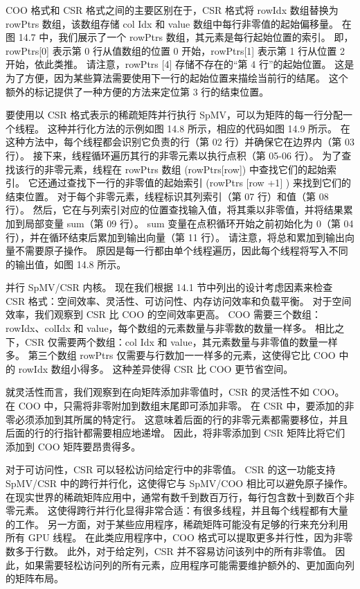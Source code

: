 COO 格式和 CSR 格式之间的主要区别在于，CSR 格式将 rowIdx 数组替换为 rowPtrs 数组，该数组存储 col Idx 和 value 数组中每行非零值的起始偏移量。 在图 14.7 中，我们展示了一个 rowPtrs 数组，其元素是每行起始位置的索引。 即，rowPtrs[0] 表示第 0 行从值数组的位置 0 开始，rowPtrs[1] 表示第 1 行从位置 2 开始，依此类推。 请注意，rowPtrs [4] 存储不存在的“第 4 行”的起始位置。 这是为了方便，因为某些算法需要使用下一行的起始位置来描绘当前行的结尾。 这个额外的标记提供了一种方便的方法来定位第 3 行的结束位置。

要使用以 CSR 格式表示的稀疏矩阵并行执行 SpMV，可以为矩阵的每一行分配一个线程。 这种并行化方法的示例如图 14.8 所示，相应的代码如图 14.9 所示。 在这种方法中，每个线程都会识别它负责的行（第 02 行）并确保它在边界内（第 03 行）。 接下来，线程循环遍历其行的非零元素以执行点积（第 05-06 行）。 为了查找该行的非零元素，线程在 rowPtrs 数组 (rowPtrs[row]) 中查找它们的起始索引。 它还通过查找下一行的非零值的起始索引 (rowPtrs [row +1$]$ ) 来找到它们的结束位置。 对于每个非零元素，线程标识其列索引（第 07 行）和值（第 08 行）。 然后，它在与列索引对应的位置查找输入值，将其乘以非零值，并将结果累加到局部变量 sum（第 09 行）。 sum 变量在点积循环开始之前初始化为 0（第 04 行），并在循环结束后累加到输出向量（第 11 行）。 请注意，将总和累加到输出向量不需要原子操作。 原因是每一行都由单个线程遍历，因此每个线程将写入不同的输出值，如图 14.8 所示。

并行 SpMV/CSR 内核。 现在我们根据 14.1 节中列出的设计考虑因素来检查 CSR 格式：空间效率、灵活性、可访问性、内存访问效率和负载平衡。 对于空间效率，我们观察到 CSR 比 COO 的空间效率更高。 COO 需要三个数组：rowIdx、colIdx 和 value，每个数组的元素数量与非零数的数量一样多。 相比之下，CSR 仅需要两个数组：col Idx 和 value，其元素数量与非零值的数量一样多。 第三个数组 rowPtrs 仅需要与行数加一一样多的元素，这使得它比 COO 中的 rowIdx 数组小得多。 这种差异使得 CSR 比 COO 更节省空间。

就灵活性而言，我们观察到在向矩阵添加非零值时，CSR 的灵活性不如 COO。 在 $\mathrm{COO}$ 中，只需将非零附加到数组末尾即可添加非零。 在 CSR 中，要添加的非零必须添加到其所属的特定行。 这意味着后面的行的非零元素都需要移位，并且后面的行的行指针都需要相应地递增。 因此，将非零添加到 CSR 矩阵比将它们添加到 $\mathrm{COO}$ 矩阵要昂贵得多。

对于可访问性，CSR 可以轻松访问给定行中的非零值。 CSR 的这一功能支持 SpMV/CSR 中的跨行并行化，这使得它与 SpMV/COO 相比可以避免原子操作。 在现实世界的稀疏矩阵应用中，通常有数千到数百万行，每行包含数十到数百个非零元素。 这使得跨行并行化显得非常合适：有很多线程，并且每个线程都有大量的工作。 另一方面，对于某些应用程序，稀疏矩阵可能没有足够的行来充分利用所有 GPU 线程。 在此类应用程序中，COO 格式可以提取更多并行性，因为非零数多于行数。 此外，对于给定列，CSR 并不容易访问该列中的所有非零值。 因此，如果需要轻松访问列的所有元素，应用程序可能需要维护额外的、更加面向列的矩阵布局。

